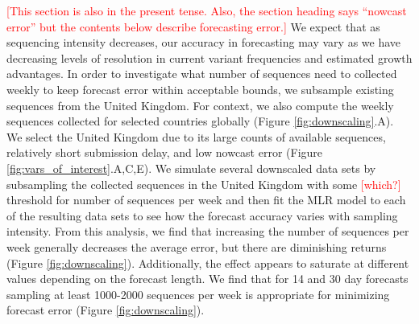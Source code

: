\documentclass[11pt,oneside,letterpaper]{article}
\def\jhc#1{\textcolor{red}{[#1]}}
\begin{document}
\jhc{This section is also in the present tense. Also, the section heading says ``nowcast error'' but the contents below describe forecasting error.}
We expect that as sequencing intensity decreases, our accuracy in forecasting may vary as we have decreasing levels of resolution in current variant frequencies and estimated growth advantages.
In order to investigate what number of sequences need to collected weekly to keep forecast error within acceptable bounds, we subsample existing sequences from the United Kingdom.
For context, we also compute the weekly sequences collected for selected countries globally (Figure \ref{fig:downscaling}.A).
We select the United Kingdom due to its large counts of available sequences, relatively short submission delay, and low nowcast error (Figure \ref{fig:vars_of_interest}.A,C,E).
We simulate several downscaled data sets by subsampling the collected sequences in the United Kingdom with some \jhc{which?} threshold for number of sequences per week and then fit the MLR model to each of the resulting data sets to see how the forecast accuracy varies with sampling intensity.
From this analysis, we find that increasing the number of sequences per week generally decreases the average error, but there are diminishing returns (Figure \ref{fig:downscaling}).
Additionally, the effect appears to saturate at different values depending on the forecast length.
We find that for 14 and 30 day forecasts sampling at least 1000-2000 sequences per week is appropriate for minimizing forecast error (Figure \ref{fig:downscaling}).
\end{document}
